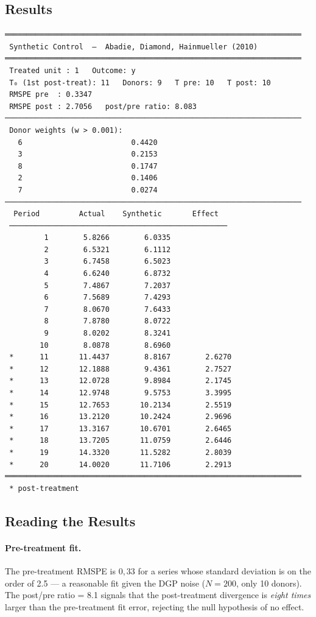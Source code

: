 \subsection*{Results}

\begin{lstlisting}[language={}, basicstyle=\ttfamily\small,
  frame=none, numbers=none, backgroundcolor=\color{codbg},
  xleftmargin=0pt, xrightmargin=0pt, breaklines=false]
════════════════════════════════════════════════════════════════════
 Synthetic Control  —  Abadie, Diamond, Hainmueller (2010)
════════════════════════════════════════════════════════════════════
 Treated unit : 1   Outcome: y
 T₀ (1st post-treat): 11   Donors: 9   T pre: 10   T post: 10
 RMSPE pre  : 0.3347
 RMSPE post : 2.7056   post/pre ratio: 8.083
────────────────────────────────────────────────────────────────────
 Donor weights (w > 0.001):
   6                         0.4420
   3                         0.2153
   8                         0.1747
   2                         0.1406
   7                         0.0274
────────────────────────────────────────────────────────────────────
  Period         Actual    Synthetic       Effect
 ──────────────────────────────────────────────────
         1        5.8266        6.0335
         2        6.5321        6.1112
         3        6.7458        6.5023
         4        6.6240        6.8732
         5        7.4867        7.2037
         6        7.5689        7.4293
         7        8.0670        7.6433
         8        7.8780        8.0722
         9        8.0202        8.3241
        10        8.0878        8.6960
 *      11       11.4437        8.8167        2.6270
 *      12       12.1888        9.4361        2.7527
 *      13       12.0728        9.8984        2.1745
 *      14       12.9748        9.5753        3.3995
 *      15       12.7653       10.2134        2.5519
 *      16       13.2120       10.2424        2.9696
 *      17       13.3167       10.6701        2.6465
 *      18       13.7205       11.0759        2.6446
 *      19       14.3320       11.5282        2.8039
 *      20       14.0020       11.7106        2.2913
════════════════════════════════════════════════════════════════════
 * post-treatment
\end{lstlisting}

\subsection*{Reading the Results}

\paragraph{Pre-treatment fit.}
The pre-treatment RMSPE is $0{,}33$ for a series whose standard deviation is
on the order of 2.5 — a reasonable fit given the DGP noise ($N=200$, only
10 donors). The post/pre ratio = 8.1 signals that the post-treatment divergence
is \emph{eight times} larger than the pre-treatment fit error, rejecting the
null hypothesis of no effect.

